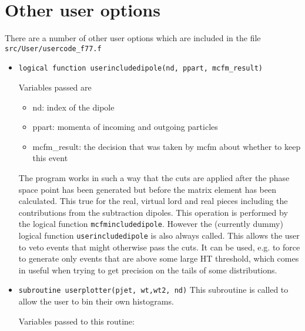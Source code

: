 \documentclass{article}
\begin{document}
\section{Other user options}
\label{user}
There are a number of other user options which are included in the file 
{\tt src/User/usercode\_f77.f}
\begin{itemize}
\item {\tt logical function userincludedipole(nd, ppart, mcfm\_result)}

   Variables passed are                                         
\begin{itemize}                                               
\item  nd:           index of the dipole
\item ppart:        momenta of incoming and outgoing particles
\item mcfm\_result:  the decision that was taken by mcfm about whether to keep this event
\end{itemize}                                                                                                                                   

The program works in such a way that the cuts are applied after the
phase space point has been generated but before the matrix element has
been calculated. This true for the real, virtual lord and real pieces
including the contributions from the subtraction dipoles. This
operation is performed by the \MCFM logical function {\tt mcfmincludedipole}.  
However the (currently dummy) logical function {\tt userincludedipole} 
is also  always called.  This allows the user to
veto events that might otherwise pass the \MCFM cuts.  It can be used,
e.g. to force \MCFM to generate only events that are above some large
HT threshold, which comes in useful when trying to get precision on
the tails of some distributions.
                                                           
\item {\tt subroutine userplotter(pjet, wt,wt2, nd)}
This subroutine is called to allow the user to bin their own       
histograms.                                                              
                                                                                                                                   
Variables passed to this routine:                                                                                               
                                                                                                                                   

\end{itemize}
\end{document}
